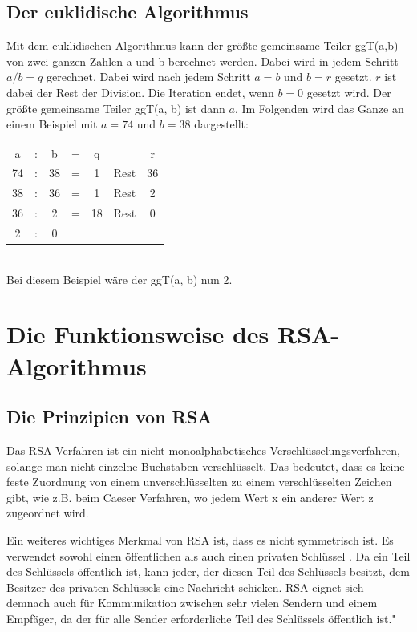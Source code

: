 \documentclass[12pt,a4paper]{scrartcl}
\begin{document}
	\subsection{Der euklidische Algorithmus}
	 Mit dem euklidischen Algorithmus kann der größte gemeinsame Teiler ggT(a,b) von zwei ganzen Zahlen a und b berechnet werden.
	 Dabei wird in jedem Schritt $a / b = q$ gerechnet. Dabei wird nach jedem Schritt $a=b$ und $b = r$ gesetzt. $r$ ist dabei der Rest der Division. Die Iteration endet, wenn $b=0$ gesetzt wird. Der größte gemeinsame Teiler ggT(a, b) ist dann $a$. \cite[S.94f]{teschl2008mathematik} Im Folgenden wird das Ganze an einem Beispiel mit $a = 74$ und $b = 38$ dargestellt: \\
	 \begin{tabular}{ c c c c c c c}
 		a & : & b & = & q & & r \\ 
 		74 & : & 38 & = & 1 & Rest & 36\\ 
 		38 & : & 36 & = & 1 & Rest & 2\\ 
 		36 & : & 2 & = & 18 & Rest & 0\\
 		2 & : & 0 & \\
	\end{tabular}\\
	Bei diesem Beispiel wäre der ggT(a, b) nun 2.
	
\pagebreak
\section{Die Funktionsweise des RSA-Algorithmus}
	\subsection{Die Prinzipien von RSA}		
	Das RSA-Verfahren ist ein nicht monoalphabetisches Verschlüsselungsverfahren, solange man nicht einzelne Buchstaben verschlüsselt. Das bedeutet, dass es keine feste Zuordnung von einem unverschlüsselten zu einem verschlüsselten Zeichen gibt, wie z.B. beim Caeser Verfahren, wo jedem Wert x ein anderer Wert z zugeordnet wird. \cite[S.9]{frauenhofer}
	
Ein weiteres wichtiges Merkmal von RSA ist, dass es nicht symmetrisch ist. Es verwendet sowohl einen öffentlichen als auch einen privaten Schlüssel \cite[S.9]{frauenhofer}. Da ein Teil des Schlüssels öffentlich ist, kann jeder, der diesen Teil des Schlüssels besitzt, dem Besitzer des privaten Schlüssels eine Nachricht schicken. \glqq RSA eignet sich demnach auch für Kommunikation zwischen sehr vielen Sendern und einem Empfäger, da der für alle Sender erforderliche Teil des Schlüssels öffentlich ist." \cite[S.9]{frauenhofer}
\end{document}
